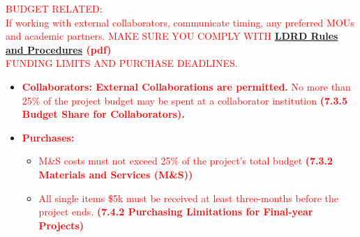 \textcolor{red}{BUDGET RELATED:}\\
\textcolor{red}{If working with external collaborators, communicate timing, any preferred MOUs and academic partners. MAKE SURE YOU COMPLY WITH \textbf{\href{https://ldrd.lanl.gov/q/public/policy?inline=true}{LDRD Rules and Procedures} (pdf)}}\\
\textcolor{red}{FUNDING LIMITS AND PURCHASE DEADLINES.}
\begin{itemize}[noitemsep,nolistsep]
    \item \textcolor{red}{\textbf{Collaborators: External Collaborations are permitted.} No more than 25\% of the project budget may be spent at a collaborator institution \textbf{(7.3.5 Budget Share for Collaborators).}}
    \item \textcolor{red}{\textbf{Purchases:}}
    \begin{itemize}[noitemsep,nolistsep]
        \item \textcolor{red}{M\&S costs must not exceed 25\% of the project’s total budget \textbf{(7.3.2 Materials and Services (M\&S))}}
        \item \textcolor{red}{All single items \> \$5k must be received at least three-months before the project ends. \textbf{(7.4.2 Purchasing Limitations for Final-year Projects)}}
    \end{itemize}
\end{itemize}

\pagebreak
{}
\setcounter{page}{1}
